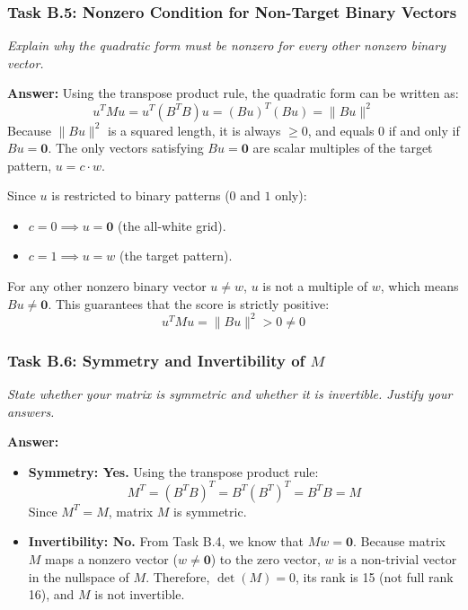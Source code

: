 \documentclass[11pt]{article}
\begin{document}
\subsubsection*{Task B.5: Nonzero Condition for Non-Target Binary Vectors}
\textit{Explain why the quadratic form must be nonzero for every other nonzero binary vector.}

\vspace{0.4em}
\textbf{Answer:}
Using the transpose product rule, the quadratic form can be written as:
\[
u^T M u = u^T (B^T B) u = (B u)^T (B u) = \|B u\|^2
\]
Because $\|B u\|^2$ is a squared length, it is always $\ge 0$, and equals 0 if and only if $B u = \mathbf{0}$. The only vectors satisfying $B u = \mathbf{0}$ are scalar multiples of the target pattern, $u = c \cdot w$.

Since $u$ is restricted to binary patterns ($0$ and $1$ only):
\begin{itemize}
    \item $c = 0 \implies u = \mathbf{0}$ (the all-white grid).
    \item $c = 1 \implies u = w$ (the target pattern).
\end{itemize}
For any other nonzero binary vector $u \neq w$, $u$ is not a multiple of $w$, which means $B u \neq \mathbf{0}$. This guarantees that the score is strictly positive:
\[
u^T M u = \|B u\|^2 > 0 \neq 0
\]

\vspace{0.8em}

\subsubsection*{Task B.6: Symmetry and Invertibility of $M$}
\textit{State whether your matrix is symmetric and whether it is invertible. Justify your answers.}

\vspace{0.4em}
\textbf{Answer:}
\begin{itemize}
    \item \textbf{Symmetry: Yes.} Using the transpose product rule:
    \[
    M^T = (B^T B)^T = B^T (B^T)^T = B^T B = M
    \]
    Since $M^T = M$, matrix $M$ is symmetric.
    \item \textbf{Invertibility: No.} From Task B.4, we know that $M w = \mathbf{0}$. Because matrix $M$ maps a nonzero vector ($w \neq \mathbf{0}$) to the zero vector, $w$ is a non-trivial vector in the nullspace of $M$. Therefore, $\det(M) = 0$, its rank is 15 (not full rank 16), and $M$ is not invertible.
\end{itemize}
\end{document}
